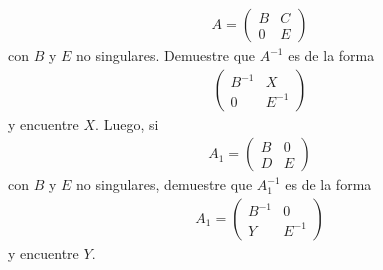 \documentclass[11pt,letterpaper]{article}
\begin{document}
\begin{enumerate}
\begin{align*}
A=\begin{pmatrix}
B & C \\
0 & E
\end{pmatrix}
\end{align*}
con $B$ y $E$ no singulares. Demuestre que $A^{-1}$ es de la forma
\begin{align*}
\begin{pmatrix}
B^{-1}& X \\
0 & E^{-1}
\end{pmatrix}
\end{align*}
y encuentre $X$. Luego, si 
\begin{align*}
A_1=\begin{pmatrix}
B & 0 \\
D & E
\end{pmatrix}
\end{align*}
con $B$ y $E$ no singulares, demuestre que $A_1^{-1}$ es de la forma 
\begin{align*}
A_1=\begin{pmatrix}
B^{-1} & 0 \\
Y & E^{-1}
\end{pmatrix}
\end{align*}
y encuentre $Y$.


\end{enumerate}
\end{document}
